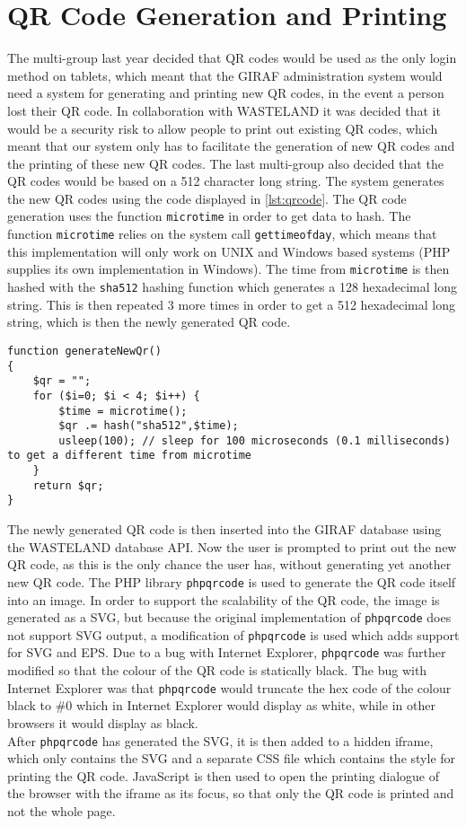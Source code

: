 \section{QR Code Generation and Printing}
\label{sec:qr}
The multi-group last year decided that QR codes would be used as the only login method on tablets, which meant that the GIRAF administration system would need a system for generating and printing new QR codes, in the event a person lost their QR code. In collaboration with WASTELAND it was decided that it would be a security risk to allow people to print out existing QR codes, which meant that our system only has to facilitate the generation of new QR codes and the printing of these new QR codes. The last multi-group also decided that the QR codes would be based on a 512 character long string. The system generates the new QR codes using the code displayed in \autoref{lst:qrcode}. The QR code generation uses the function \texttt{microtime} in order to get data to hash. The function \texttt{microtime} relies on the system call \texttt{gettimeofday}, which means that this implementation will only work on UNIX and Windows based systems (PHP supplies its own implementation in Windows). The time from \texttt{microtime} is then hashed with the \texttt{sha512} hashing function which generates a 128 hexadecimal long string. This is then repeated 3 more times in order to get a 512 hexadecimal long string, which is then the newly generated QR code.

\begin{lstlisting}[firstline=1,caption={QR Code Generation},label=lst:qrcode]
function generateNewQr()
{
	$qr = "";
	for ($i=0; $i < 4; $i++) { 
		$time = microtime();
		$qr .= hash("sha512",$time);
		usleep(100); // sleep for 100 microseconds (0.1 milliseconds) to get a different time from microtime
	}
	return $qr;
}
\end{lstlisting}

The newly generated QR code is then inserted into the GIRAF database using the WASTELAND database API. Now the user is prompted to print out the new QR code, as this is the only chance the user has, without generating yet another new QR code. The PHP library \texttt{phpqrcode}\citep{phpqrcode} is used to generate the QR code itself into an image. In order to support the scalability of the QR code, the image is generated as a SVG, but because the original implementation of \texttt{phpqrcode} does not support SVG output, a modification of \texttt{phpqrcode} is used\citep{phpqrcodet0k4rt} which adds support for SVG and EPS. Due to a bug with Internet Explorer, \texttt{phpqrcode} was further modified so that the colour of the QR code is statically black. The bug with Internet Explorer was that \texttt{phpqrcode} would truncate the hex code of the colour black to \#0 which in Internet Explorer would display as white, while in other browsers it would display as black. \\
After \texttt{phpqrcode} has generated the SVG, it is then added to a hidden iframe, which only contains the SVG and a separate CSS file which contains the style for printing the QR code. JavaScript is then used to open the printing dialogue of the browser with the iframe as its focus, so that only the QR code is printed and not the whole page.
